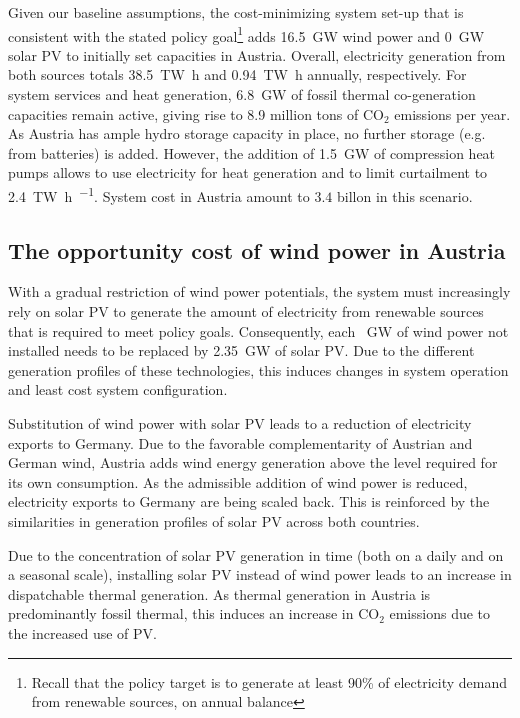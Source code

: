 \documentclass[final, 3p, times]{elsarticle} %
\newcommand{\COO}{\ensuremath{\mathrm{CO_2}} }
\begin{document}
    Given our baseline assumptions, the cost-minimizing system set-up that is consistent with the stated policy
    goal\footnote{Recall that the policy target is to generate at least 90\% of electricity demand from renewable sources, on annual balance}
    adds \SI{16.5}{\giga\watt} wind power and \SI{0}{\giga\watt} solar PV to initially set capacities in Austria.
    Overall, electricity generation from both sources totals \SI{38.5}{\tera\watt\hour} and
    \SI{0.94}{\tera\watt\hour} annually, respectively.
    For system services and heat generation, \SI{6.8}{\giga\watt} of fossil thermal co-generation capacities remain
    active, giving rise to \SI{8.9}{} million tons of \COO emissions per year.
    As Austria has ample hydro storage capacity in place, no further storage (e.g. from batteries) is added.
    However, the addition of \SI{1.5}{\giga\watt} of compression heat pumps allows to use electricity for heat
    generation and to limit curtailment to \SI{2.4}{\tera\watt\hour\per\year}.
    System cost in Austria amount to $3.4$ billon \EUR in this scenario.

    \subsection{The opportunity cost of wind power in Austria}\label{subsec:opportunity-cost-wind}
    With a gradual restriction of wind power potentials, the system must increasingly rely on solar PV to generate the
    amount of electricity from renewable sources that is required to meet policy goals.
    Consequently, each \SI{}{\giga\watt} of wind power not installed needs to be replaced by \SI{2.35}{\giga\watt} of
    solar PV\@.
    Due to the different generation profiles of these technologies, this induces changes in system operation and least
    cost system configuration.

    Substitution of wind power with solar PV leads to a reduction of electricity exports to Germany.
    Due to the favorable complementarity of Austrian and German wind, Austria adds wind energy generation above the level
    required for its own consumption.
    As the admissible addition of wind power is reduced, electricity exports to Germany are being scaled back.
    This is reinforced by the similarities in generation profiles of solar PV across both countries.

    Due to the concentration of solar PV generation in time (both on a daily and on a seasonal scale), installing solar
    PV instead of wind power leads to an increase in dispatchable thermal generation.
    As thermal generation in Austria is predominantly fossil thermal, this induces an increase in \COO emissions due
    to the increased use of PV\@.
\end{document}
